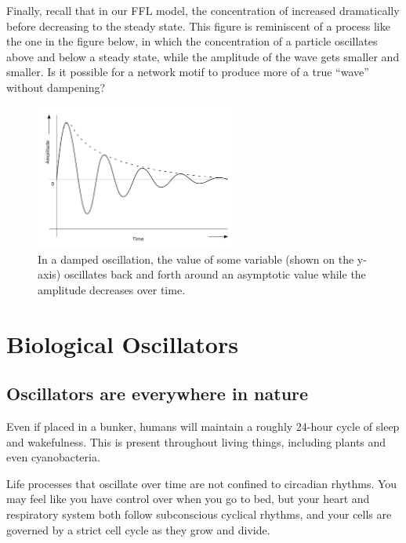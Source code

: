 Finally, recall that in our FFL model, the concentration of  increased dramatically before decreasing to the steady state. This figure is reminiscent of a  process like the one in the figure below, in which the concentration of a particle oscillates above and below a steady state, while the amplitude of the wave gets smaller and smaller. Is it possible for a network motif to produce more of a true ``wave'' without dampening?\\

\begin{figure}[h]
\centering
\mySfFamily
\includegraphics[width = 0.6\textwidth]{../images/damped_oscillator.png}
\caption{In a damped oscillation, the value of some variable (shown on the y-axis) oscillates back and forth around an asymptotic value while the amplitude decreases over time.}
\label{fig:damped_oscillator}
\end{figure}


\FloatBarrier
{}

\section{Biological Oscillators}
\label{sec:biological_oscillators}

\subsection{Oscillators are everywhere in nature}

Even if placed in a bunker, humans will maintain a roughly 24-hour cycle of sleep and wakefulness. This  is present throughout living things, including plants and even cyanobacteria.

Life processes that oscillate over time are not confined to circadian rhythms. You may feel like you have control over when you go to bed, but your heart and respiratory system both follow subconscious cyclical rhythms, and your cells are governed by a strict cell cycle as they grow and divide.

